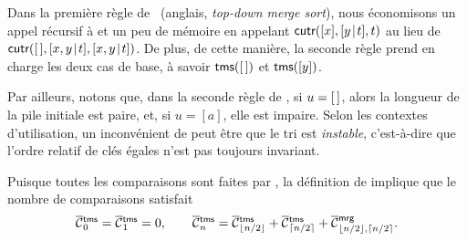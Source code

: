 Dans la première règle de~ (anglais, \emph{top-down merge
  sort}), nous économisons un appel récursif à  et un peu
de mémoire en appelant \(\textsf{cutr}([x],[{y}\!\mid\!{t}], t)\) au lieu de
\(\textsf{cutr}([\,],[{x,y}\!\mid\!{t}],[{x,y}\!\mid\!{t}])\). De plus, de cette
manière, la seconde règle prend en charge les deux cas de base, à
savoir \(\textsf{tms}([\,])\) et \(\textsf{tms}([y])\).

Par ailleurs, notons que, dans la seconde règle de , si
\(u = [\,]\), alors la longueur de la pile initiale est paire, et, si
\(u = [a]\), elle est impaire. Selon les contextes d'utilisation, un
inconvénient de  peut être que le
tri est \emph{instable}, c'est-à-dire que l'ordre relatif de clés
égales n'est pas toujours invariant.

Puisque toutes les comparaisons sont faites par
, la définition de
 implique que le nombre de
comparaisons satisfait
\begin{equation}
\OC{\fun{tms}}{0} = \OC{\fun{tms}}{1} = 0,
\qquad
\OC{\fun{tms}}{n} = \OC{\fun{tms}}{\floor{n/2}}
+ \OC{\fun{tms}}{\ceiling{n/2}}
+ \OC{\fun{mrg}}{\floor{n/2},\ceiling{n/2}}.
\index{tms@$\OC{\fun{tms}}{n}$}
\label{eq:cost_tms}
\end{equation}


